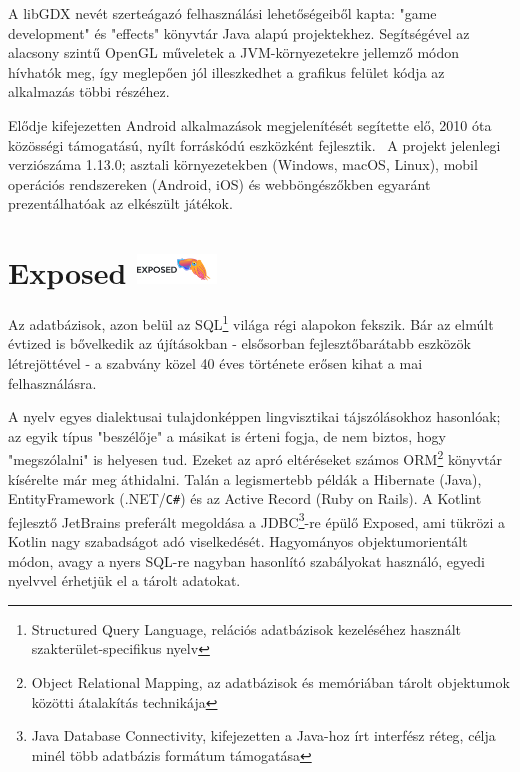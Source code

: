 A libGDX nevét szerteágazó felhasználási lehetőségeiből kapta: "game development" és "effects" könyvtár Java alapú projektekhez. Segítségével az alacsony szintű OpenGL műveletek a JVM-környezetekre jellemző módon hívhatók meg, így meglepően jól illeszkedhet a grafikus felület kódja az alkalmazás többi részéhez.

Elődje kifejezetten Android alkalmazások megjelenítését segítette elő, 2010 óta közösségi támogatású, nyílt forráskódú eszközként fejlesztik.~\cite{LibgdxHistory} A projekt jelenlegi verziószáma 1.13.0; asztali környezetekben (Windows, macOS, Linux), mobil operációs rendszereken (Android, iOS) és webböngészőkben egyaránt prezentálhatóak az elkészült játékok.

\section{Exposed {\hspace{1cm}\includegraphics[height=8mm, keepaspectratio]{images/exposed_logo.png}}}

Az adatbázisok, azon belül az SQL\footnote{Structured Query Language, relációs adatbázisok kezeléséhez használt szakterület-specifikus nyelv} világa régi alapokon fekszik. Bár az elmúlt évtized is bővelkedik az újításokban - elsősorban fejlesztőbarátabb eszközök létrejöttével - a szabvány közel 40 éves története erősen kihat a mai felhasználásra.

A nyelv egyes dialektusai tulajdonképpen lingvisztikai tájszólásokhoz hasonlóak; az egyik típus "beszélője" a másikat is érteni fogja, de nem biztos, hogy "megszólalni" is helyesen tud. Ezeket az apró eltéréseket számos ORM\footnote{Object Relational Mapping, az adatbázisok és memóriában tárolt objektumok közötti átalakítás technikája} könyvtár kísérelte már meg áthidalni. Talán a legismertebb példák a Hibernate (Java), EntityFramework (.NET/\texttt{C\#}) és az Active Record (Ruby on Rails). A Kotlint fejlesztő JetBrains preferált megoldása a JDBC\footnote{Java Database Connectivity, kifejezetten a Java-hoz írt interfész réteg, célja minél több adatbázis formátum támogatása}-re épülő Exposed, ami tükrözi a Kotlin nagy szabadságot adó viselkedését. Hagyományos objektumorientált módon, avagy a nyers SQL-re nagyban hasonlító szabályokat használó, egyedi nyelvvel érhetjük el a tárolt adatokat.~\cite{ExposedDocs}

